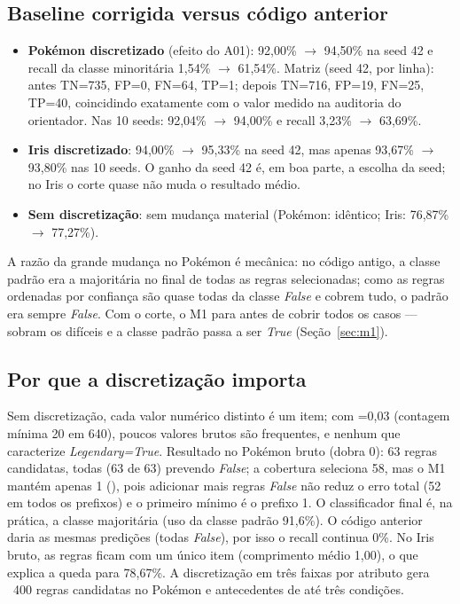 \documentclass[a4paper,11pt]{article}
\newcommand{\code}[1]{\texttt{\detokenize{#1}}}
\begin{document}
\subsection{Baseline corrigida versus c\'odigo anterior}


\begin{itemize}
  \item \textbf{Pok\'emon discretizado} (efeito do A01): 92,00\% $\to$ 94,50\% na seed 42 e recall da classe minorit\'aria 1,54\% $\to$ 61,54\%. Matriz (seed 42, por linha): antes TN=735, FP=0, FN=64, TP=1; depois TN=716, FP=19, FN=25, TP=40, coincidindo exatamente com o valor medido na auditoria do orientador. Nas 10 seeds: 92,04\% $\to$ 94,00\% e recall 3,23\% $\to$ 63,69\%.
  \item \textbf{Iris discretizado}: 94,00\% $\to$ 95,33\% na seed 42, mas apenas 93,67\% $\to$ 93,80\% nas 10 seeds. O ganho da seed 42 \'e, em boa parte, a escolha da seed; no Iris o corte quase n\~ao muda o resultado m\'edio.
  \item \textbf{Sem discretiza\c{c}\~ao}: sem mudan\c{c}a material (Pok\'emon: id\^entico; Iris: 76,87\% $\to$ 77,27\%).
\end{itemize}
A raz\~ao da grande mudan\c{c}a no Pok\'emon \'e mecânica: no c\'odigo antigo, a classe padr\~ao era a majorit\'aria no final de todas as regras selecionadas; como as regras ordenadas por confian\c{c}a s\~ao quase todas da classe \emph{False} e cobrem tudo, o padr\~ao era sempre \emph{False}. Com o corte, o M1 para antes de cobrir todos os casos --- sobram os dif\'iceis e a classe padr\~ao passa a ser \emph{True} (Se\c{c}\~ao~\ref{sec:m1}).

\subsection{Por que a discretiza\c{c}\~ao importa}

Sem discretiza\c{c}\~ao, cada valor num\'erico distinto \'e um item; com \code{min_support}=0,03 (contagem m\'inima 20 em 640), poucos valores brutos s\~ao frequentes, e nenhum que caracterize \emph{Legendary=True}. Resultado no Pok\'emon bruto (dobra 0): 63 regras candidatas, todas (63 de 63) prevendo \emph{False}; a cobertura seleciona 58, mas o M1 mant\'em apenas 1 (\code{HP=60 => Legendary=False}), pois adicionar mais regras \emph{False} n\~ao reduz o erro total (52 em todos os prefixos) e o primeiro m\'inimo \'e o prefixo 1. O classificador final \'e, na pr\'atica, a classe majorit\'aria (uso da classe padr\~ao 91,6\%). O c\'odigo anterior daria as mesmas predi\c{c}\~oes (todas \emph{False}), por isso o recall continua 0\%. No Iris bruto, as regras ficam com um \'unico item (comprimento m\'edio 1,00), o que explica a queda para 78,67\%. A discretiza\c{c}\~ao em três faixas por atributo gera ~400 regras candidatas no Pok\'emon e antecedentes de at\'e três condi\c{c}\~oes.
\end{document}
